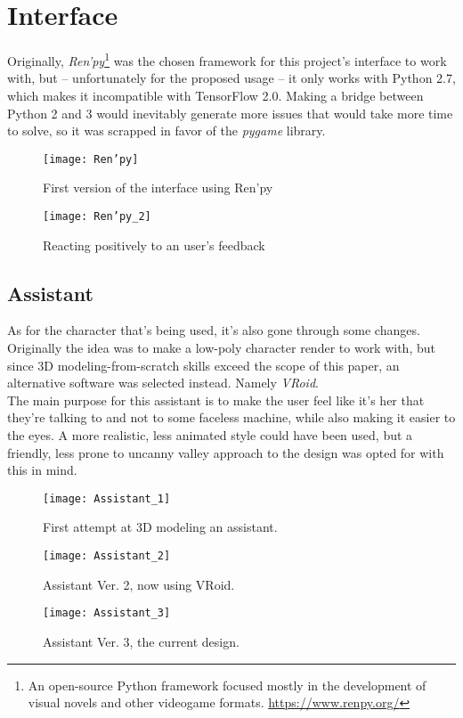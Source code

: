 \section{Interface}
Originally, \textit{Ren'py}\footnote{An open-source Python framework focused mostly in the development of visual novels and other videogame formats. \url{https://www.renpy.org/}} was the chosen framework for this project's interface to work with, but -- unfortunately for the proposed usage -- it only works with Python 2.7, which makes it incompatible with TensorFlow 2.0. Making a bridge between Python 2 and 3 would inevitably generate more issues that would take more time to solve, so it was scrapped in favor of the \textit{pygame} library.
\pagebreak

\begin{figure}[!h]
	\centering
	\texttt{[image: Ren'py]}
	\caption{First version of the interface using Ren'py}
	\label{fig:renpy_test_1}
\end{figure}
\begin{figure}[!h]
	\centering
	\texttt{[image: Ren'py\_2]}
	\caption{Reacting positively to an user's feedback}
	\label{fig:renpy_test_2}
\end{figure}

\pagebreak

\subsection{Assistant}
As for the character that's being used, it's also gone through some changes. Originally the idea was to make a low-poly character render to work with, but since 3D modeling-from-scratch skills exceed the scope of this paper, an alternative software was selected instead. Namely \textit{VRoid}.\\
The main purpose for this assistant is to make the user feel like it's her that they're talking to and not to some faceless machine, while also making it easier to the eyes. A more realistic, less animated style could have been used, but a friendly, less prone to uncanny valley approach to the design was opted for with this in mind.
\begin{figure}[!ht]
	\centering
	\texttt{[image: Assistant\_1]}
	\caption{First attempt at 3D modeling an assistant.}
	\label{fig:assistant1}
\end{figure}
\begin{figure}[!ht]
	\centering
	\texttt{[image: Assistant\_2]}
	\caption{Assistant Ver. 2, now using VRoid.}
	\label{fig:assistant2}
\end{figure}
\begin{figure}[!ht]
	\centering
	\texttt{[image: Assistant\_3]}
	\caption{Assistant Ver. 3, the current design.}
	\label{fig:assistant3}
\end{figure}


